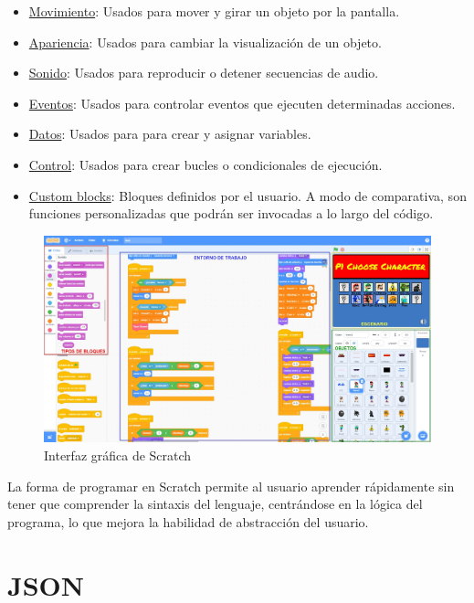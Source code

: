 \documentclass[a4paper, 12pt]{book}
\begin{document}
\begin{itemize}
  	\item \underline{Movimiento}: Usados para mover y girar un objeto por la pantalla.
  	\item \underline{Apariencia}: Usados para cambiar la visualización de un objeto.
  	\item \underline{Sonido}: Usados para reproducir o detener secuencias de audio.
  	\item \underline{Eventos}: Usados para controlar eventos que ejecuten determinadas acciones.
  	\item \underline{Datos}: Usados para para crear y asignar variables.
  	\item \underline{Control}: Usados para crear bucles o condicionales de ejecución.
  	\item \underline{Custom blocks}: Bloques definidos por el usuario. A modo de comparativa, son funciones personalizadas que podrán ser invocadas a lo largo del código.
\end{itemize}

\begin{figure}[htb!]
\centering
\includegraphics[width=17cm, keepaspectratio]{img/scratch.jpg}
\caption{Interfaz gráfica de Scratch}
\label{fig:scratch}
\end{figure}

La forma de programar en Scratch permite al usuario aprender rápidamente sin tener que comprender la sintaxis del lenguaje, centrándose en la lógica del programa, lo que mejora la habilidad de abstracción del usuario\cite{arotuma2017programacion}.

\section{JSON}
\label{sec:Json}
\end{document}
